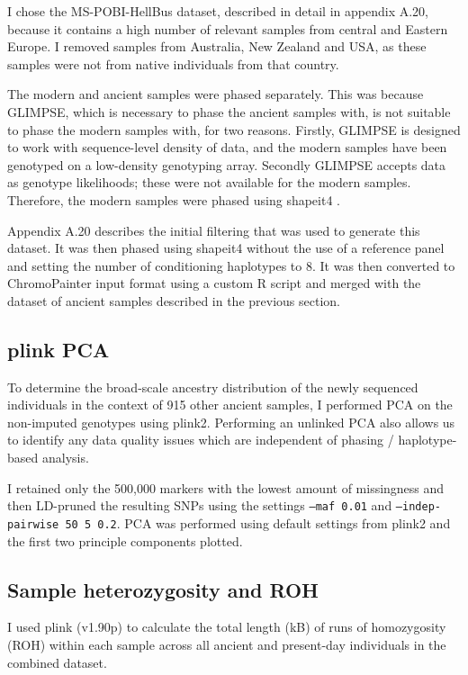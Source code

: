 I chose the MS-POBI-HellBus dataset, described in detail in appendix A.20, because it contains a high number of relevant samples from central and Eastern Europe. I removed samples from Australia, New Zealand and USA, as these samples were not from native individuals from that country.  

The modern and ancient samples were phased separately. This was because GLIMPSE, which is necessary to phase the ancient samples with, is not suitable to phase the modern samples with, for two reasons. Firstly, GLIMPSE is designed to work with sequence-level density of data, and the modern samples have been genotyped on a low-density genotyping array. Secondly GLIMPSE accepts data as genotype likelihoods; these were not available for the modern samples. Therefore, the modern samples were phased using shapeit4 \cite{delaneau2018integrative}.

Appendix A.20 describes the initial filtering that was used to generate this dataset. It was then phased using shapeit4 \cite{delaneau2018integrative} without the use of a reference panel and setting the number of conditioning haplotypes to 8. It was then converted to ChromoPainter input format using a custom R script and merged with the dataset of ancient samples described in the previous section.

\subsection{plink PCA}

To determine the broad-scale ancestry distribution of the newly sequenced individuals in the context of 915 other ancient samples, I performed PCA on the non-imputed genotypes using plink2. Performing an unlinked PCA also allows us to identify any data quality issues which are independent of phasing / haplotype-based analysis. 

I retained only the 500,000 markers with the lowest amount of missingness and then LD-pruned the resulting SNPs using the settings \texttt{--maf 0.01} and \texttt{--indep-pairwise 50 5 0.2}. PCA was performed using default settings from plink2 and the first two principle components plotted.

\subsection{Sample heterozygosity and ROH}

I used plink (v1.90p) to calculate the total length (kB) of runs of homozygosity (ROH) within each sample across all ancient and present-day individuals in the combined dataset. 

